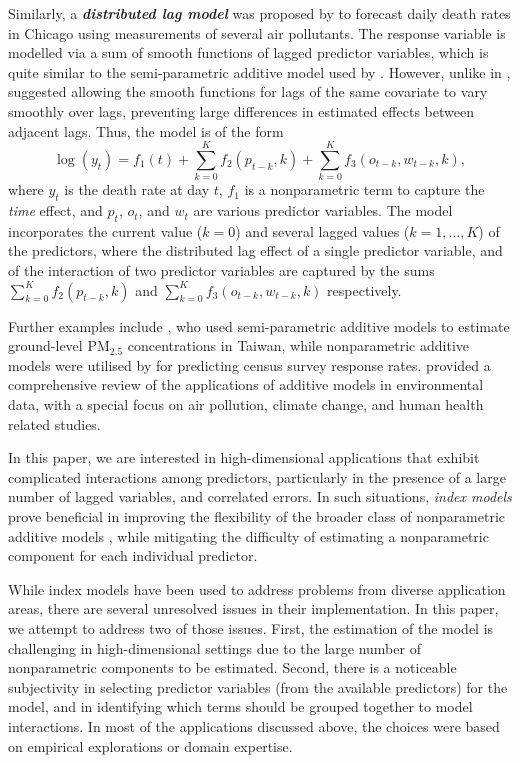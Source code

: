\documentclass[
  11pt,
  a4paper,
]{article}
\begin{document}
Similarly, a \textbf{\emph{distributed lag model}} was proposed by
\textcite{Wood2017} to forecast daily death rates in Chicago using
measurements of several air pollutants. The response variable is
modelled via a sum of smooth functions of lagged predictor variables,
which is quite similar to the semi-parametric additive model used by
\textcite{FH2012}. However, unlike in \textcite{FH2012},
\textcite{Wood2017} suggested allowing the smooth functions for lags of
the same covariate to vary smoothly over lags, preventing large
differences in estimated effects between adjacent lags. Thus, the model
is of the form \[
 \log(y_{t}) = f_{1}(t) + \sum_{k=0}^{K} f_{2}(p_{t-k}, k) + \sum_{k=0}^{K} f_{3}(o_{t-k}, w_{t-k}, k),
\] where \(y_{t}\) is the death rate at day \(t\), \(f_{1}\) is a
nonparametric term to capture the \emph{time} effect, and \(p_t\),
\(o_t\), and \(w_t\) are various predictor variables. The model
incorporates the current value (\(k = 0\)) and several lagged values
(\(k = 1, \dots, K\)) of the predictors, where the distributed lag
effect of a single predictor variable, and of the interaction of two
predictor variables are captured by the sums
\(\sum_{k=0}^{K} f_{2}(p_{t-k}, k)\) and
\(\sum_{k=0}^{K} f_{3}(o_{t-k}, w_{t-k}, k)\) respectively.

Further examples include \textcite{Ho2020}, who used semi-parametric
additive models to estimate ground-level \(\text{PM}_{2.5}\)
concentrations in Taiwan, while nonparametric additive models were
utilised by \textcite{Ibrahim2023} for predicting census survey response
rates. \textcite{Ravindra2019} provided a comprehensive review of the
applications of additive models in environmental data, with a special
focus on air pollution, climate change, and human health related
studies.

In this paper, we are interested in high-dimensional applications that
exhibit complicated interactions among predictors, particularly in the
presence of a large number of lagged variables, and correlated errors.
In such situations, \emph{index models} prove beneficial in improving
the flexibility of the broader class of nonparametric additive models
\autocite{Radchenko2015}, while mitigating the difficulty of estimating
a nonparametric component for each individual predictor.

While index models have been used to address problems from diverse
application areas, there are several unresolved issues in their
implementation. In this paper, we attempt to address two of those
issues. First, the estimation of the model is challenging in
high-dimensional settings due to the large number of nonparametric
components to be estimated. Second, there is a noticeable subjectivity
in selecting predictor variables (from the available predictors) for the
model, and in identifying which terms should be grouped together to
model interactions. In most of the applications discussed above, the
choices were based on empirical explorations or domain expertise.
\end{document}

